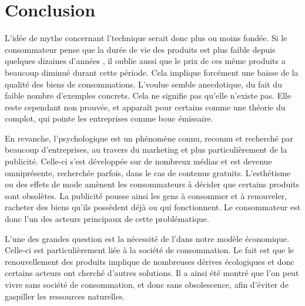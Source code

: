 \chapter*{Conclusion}

%
%
%
%
%

L'idée de mythe concernant l'\op technique serait donc plus ou moins fondée. Si le consommateur pense que la durée de vie des produits est plus faible depuis quelques dizaines d'années , il oublie aussi que le prix de ces même produits a beaucoup diminué durant cette période. Cela implique forcément une baisse de la qualité des biens de consommations. L'\op voulue semble anecdotique, du fait du faible nombre d'exemples concrets. Cela ne signifie pas qu'elle n'existe pas. Elle reste cependant non prouvée, et apparaît pour certains comme une théorie du complot, qui pointe les entreprises comme bouc émissaire. 

\bigbreak
En revanche, l'\op psychologique est un phénomène connu, reconnu et recherché par beaucoup d'entreprises, au travers du marketing et plus particulièrement de la publicité. Celle-ci s'est développée sur de nombreux médias et est devenue omniprésente, recherchée parfois, dans le cas de contenus gratuits. L'esthétisme ou des effets de mode amènent les consommateurs à décider que certains produits sont obsolètes. La publicité pousse ainsi les gens à consommer et à renouveler, racheter des biens qu'ils possèdent déjà ou qui fonctionnent. Le consommateur est donc l'un des acteurs principaux de cette problématique.

\bigbreak
L'une des grandes question est la nécessité de l'\op dans notre modèle économique. Celle-ci est particulièrement liée à la société de consommation. Le fait est que le renouvellement des produits implique de nombreuses dérives écologiques et donc certains acteurs ont cherché d'autres solutions. Il a ainsi été montré que l'on peut vivre sans société de consommation, et donc sans obsolescence, afin d'éviter de gaspiller les ressources naturelles.